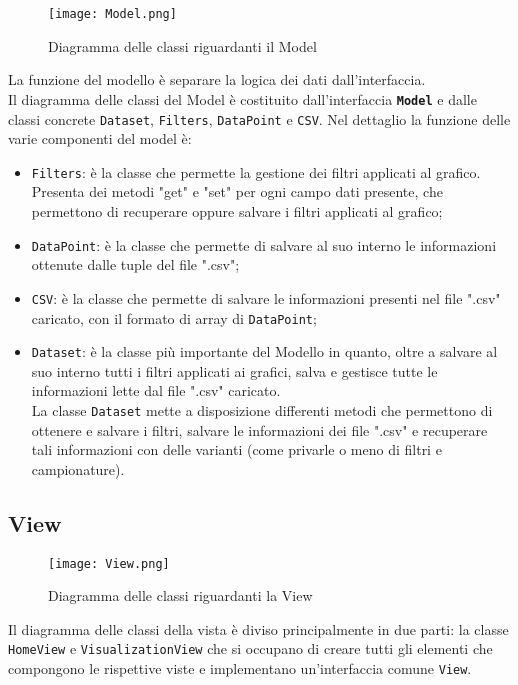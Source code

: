 \begin{figure}[H]
	\centering
	\texttt{[image: Model.png]}
	\caption{Diagramma delle classi riguardanti il Model}
  \end{figure}
La funzione del modello è separare la logica dei dati dall'interfaccia.\\
Il diagramma delle classi del Model è costituito dall'interfaccia \textbf{\texttt{Model}} e dalle classi concrete \texttt{Dataset}, \texttt{Filters}, \texttt{DataPoint} e \texttt{CSV}.
Nel dettaglio la funzione delle varie componenti del model è:
\begin{itemize}
	\item \texttt{Filters}: è la classe che permette la gestione dei filtri applicati al grafico. Presenta dei metodi "get" e "set" per ogni campo dati presente, che permettono di recuperare oppure salvare i filtri applicati al grafico;
	\item \texttt{DataPoint}: è la classe che permette di salvare al suo interno le informazioni ottenute dalle tuple del file ".csv";
	\item \texttt{CSV}: è la classe che permette di salvare le informazioni presenti nel file ".csv" caricato, con il formato di array di \texttt{DataPoint};
	\item \texttt{Dataset}: è la classe più importante del Modello in quanto, oltre a salvare al suo interno tutti i filtri applicati ai grafici, salva e gestisce tutte le informazioni lette dal file ".csv" caricato.\\ La classe \texttt{Dataset} mette a disposizione differenti metodi che permettono di ottenere e salvare i filtri, salvare le informazioni dei file ".csv" e recuperare tali informazioni con delle varianti (come privarle o meno di filtri e campionature).
\end{itemize}

\subsection{View}
\begin{figure}[H]
    \texttt{[image: View.png]}
    \caption{Diagramma delle classi riguardanti la View}
\end{figure}
Il diagramma delle classi della vista è diviso principalmente in due parti: la classe \texttt{HomeView} e \texttt{VisualizationView} che si occupano di creare tutti gli elementi che compongono le rispettive viste e implementano un'interfaccia comune \texttt{View}.

